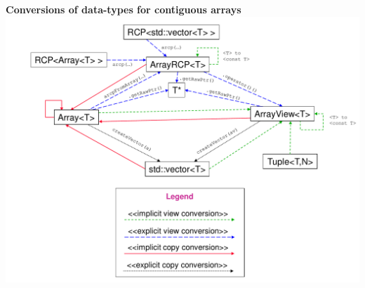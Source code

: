 \begin{center}
{}\textbf{Conversions of data-types for contiguous arrays}
\includegraphics*[scale=0.65]
{TeuchosArrayConversions}

\pagebreak



\pagebreak



\end{center}
